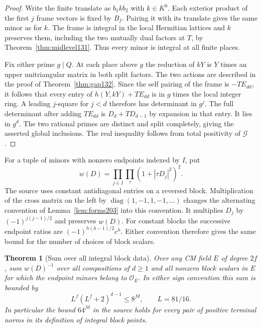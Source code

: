 \documentclass[a4paper,11pt]{article}
\newtheorem{theorem}[proposition]{Theorem}
\theoremstyle{definition}
\theoremstyle{remark}
\numberwithin{equation}{section}
\begin{document}
\begin{proof}
Write the finite translate as \(b_1kb_2\) with \(k\in K^0\).
Each exterior product of the first \(j\) frame vectors is fixed
by \(B_f\). Pairing it with its translate gives the same minor
as for \(k\). The frame is integral in the local Hermitian
lattices and \(k\) preserves them, including the two mutually
dual factors at \(T\), by Theorem~\ref{thm:midlevel131}.
Thus every minor is integral at all finite places.

Fix either prime \(g\mid Q\). At each place above \(g\) the
reduction of \(kY\) is \(Y\) times an upper unitriangular matrix
in both split factors. The two actions are described in the proof
of Theorem~\ref{thm:gap132}. Since the self pairing of the frame
is \(-T E_{dd}\), it follows that every entry of \(h(Y,kY)+T E_{dd}\)
is in \(g\) times the local integer ring. A leading \(j\)-square
for \(j<d\) therefore has determinant in \(g^j\). The full
determinant after adding \(T E_{dd}\) is \(D_d+T D_{d-1}\) by
expansion in that entry. It lies in \(g^d\). The two rational
primes are distinct and split completely, giving the asserted
global inclusions. The real inequality follows from total positivity
of \(\mathcal G\).
\end{proof}

For a tuple of minors with nonzero endpoints indexed by \(I\), put
\[
      w(D)=\prod_{j\in I}\prod_\tau (1+|\tau D_j|^2)^2 .
\]
The source uses constant antidiagonal entries on a reversed block.
Multiplication of the cross matrix on the left by
\(\operatorname{diag}(1,-1,1,-1,\ldots)\) changes the alternating
convention of Lemma~\ref{lem:forms203} into this convention. It
multiplies \(D_j\) by \((-1)^{j(j-1)/2}\) and preserves \(w(D)\).
For constant blocks the successive endpoint ratios are
\((-1)^{h(h-1)/2}c^h\). Either convention therefore gives the
same bound for the number of choices of block scalars.

\begin{theorem}[Sum over all integral block data]\label{thm:allorbits203}
Over any CM field \(E\) of degree \(2f\), sum \(w(D)^{-1}\) over
all compositions of \(d\ge1\) and all nonzero block scalars in \(E\)
for which the endpoint minors belong to \(\mathcal O_E\). In either
sign convention this sum is bounded by
\[
             L^f(L^f+2)^{d-1}\le 8^{fd},\qquad L=81/16 .
\]
In particular the bound \(64^{fd}\) in the source holds for every
pair of positive terminal norms in its definition of integral
block points.
\end{theorem}
\end{document}
